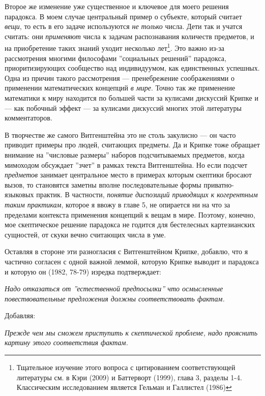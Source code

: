 \documentclass[11pt]{book}
\begin{document}
Второе же изменение уже существенное и ключевое для моего решения парадокса. В моем случае центральный пример о субъекте, который считает \textit{вещи}, то есть в его задаче используются \textit{не только} числа. Дети так и учатся считать: они \textit{применяют} числа к задачам распознавания количеств предметов, и на приобретение таких знаний уходит несколько лет\footnote{Тщательное изучение этого вопроса с цитированием соответствующей литературы см. в Кэри (2009) и Баттерворт (1999), глава 3, разделы 1-4. Классическим исследованием является Гельман и Галлистел (1986)}. Это важно из-за рассмотрения многими философами ''социальных решений'' парадокса, приоритизирующих сообщество над индивидуумом, как единственных успешных. Одна из причин такого рассмотрения --- пренебрежение соображениями о применении математических концепций \textit{в мире}. Точно так же применение математики к миру находится по большей части за кулисами дискуссий Крипке и --- как побочный эффект --- за кулисами дискуссий многих этой литературы комментаторов.

В творчестве же самого Витгенштейна это не столь закулисно --- он часто приводит примеры про людей, считающих предметы. Да и Крипке тоже обращает внимание на ''числовые размеры'' наборов подсчитываемых предметов, когда мимоходом обсуждает ''зчет'' в рамках текста Витгенштейна. Но если подсчет \textit{предметов} занимает центральное место в примерах которым скептики бросают вызов, то становятся заметны вполне последовательные формы приватно-языковых практик. В частности, \textit{понятие диспозиций приводящих к когерентным таким практикам}, которое я ввожу в главе 5, не опирается ни на что за пределами контекста применения концепций к вещам в мире. Поэтому, конечно, мое скептическое решение парадокса не годится для бестелесных картезианских сущностей, от скуки вечно считающих числа в уме.

Оставляя в стороне эти разногласия с Витгенштейном Крипке, добавлю, что я частично согласен с одной важной леммой, которую Крипке выводит и парадокса и которую он (1982, 78-79) изредка подтверждает:

\smallskip

\textit{Надо отказаться от ''естественной предпосылки'' что осмысленные повествовательные предложения должны соответствовать фактам.}

\smallskip

Добавляя:

\smallskip

\textit{Прежде чем мы сможем приступить к скептической проблеме, надо прояснить картину этого соответствия фактам.}
\end{document}
